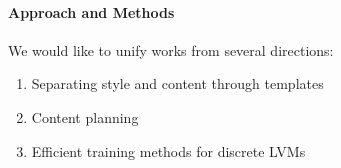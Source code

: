 \documentclass[11pt]{article}
\begin{document}
\paragraph{Approach and Methods}
We would like to unify works from several directions:
\begin{enumerate}
\item Separating style and content through templates \citep{sauper2009wiki,wiseman2018template}
\item Content planning \citep{puduppully2018contentselection}
\item Efficient training methods for discrete LVMs \citep{deng2018vattn}
\end{enumerate}
\end{document}

